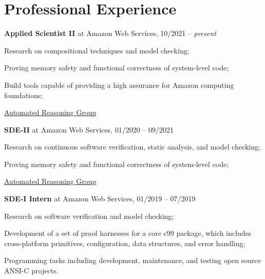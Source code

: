 \documentclass[letterpaper]{article}
\renewenvironment{itemize}{
  \begin{list}{}{
    \setlength{\leftmargin}{1.5em}
  }
}{
  \end{list}
}
\begin{document}
\section*{Professional Experience}

    \begin{enumerate}
      \item{{\bf Applied Scientist II} at Amazon Web Services, 10/2021 -- {\it present}}
      \begin{itemize}
        \item{\textendash} {Research on compositional techniques and model checking;}
        \item{\textendash} {Proving memory safety and functional correctness of system-level code;}
        \item{\textendash} {Build tools capable of providing a high assurance for Amazon computing foundations;}
        \item{\textendash} \href{https://aws.amazon.com/security/provable-security/?sc_channel=EL&sc_campaign=Promo_2018_vid&sc_medium=YouTube&sc_content=video3507&sc_detail=CAREERS&sc_country=US}{Automated Reasoning Group}
      \end{itemize}
      \item{{\bf SDE-II} at Amazon Web Services, 01/2020 -- 09/2021}
      \begin{itemize}
        \item{\textendash} {Research on continuous software verification, static analysis, and model checking;}
        \item{\textendash} {Proving memory safety and functional correctness of system-level code;}
        \item{\textendash} \href{https://aws.amazon.com/security/provable-security/?sc_channel=EL&sc_campaign=Promo_2018_vid&sc_medium=YouTube&sc_content=video3507&sc_detail=CAREERS&sc_country=US}{Automated Reasoning Group}
      \end{itemize}
     \item{{\bf SDE-I Intern} at Amazon Web Services, 01/2019 -- 07/2019}
      \begin{itemize}
        \item{\textendash} {Research on software verification and model checking;}
        \item{\textendash} {Development of a set of proof harnesses for a core c99 package, which includes cross-platform primitives, configuration, data structures, and error handling;}
        \item{\textendash} {Programming tasks including development, maintenance, and testing open source ANSI-C projects.}

\end{itemize}
\end{enumerate}
\end{document}
